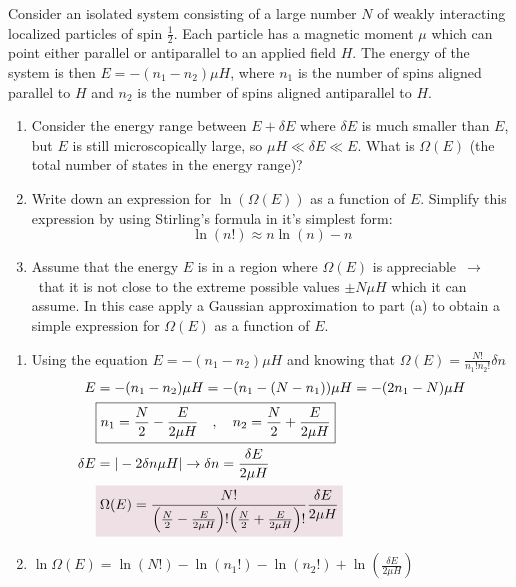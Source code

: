\documentclass{article}
\begin{document}
    \begin{problem}[Reif 2.4]
        Consider an isolated system consisting of a large number $N$ of weakly interacting localized particles of spin $\frac{1}{2}$. Each particle has a magnetic moment $\mu$ which can point either parallel or antiparallel to an applied field $H$. The energy of the system is then $E=-(n_1-n_2)\mu H$, where $n_1$ is the number of spins aligned parallel to $H$ and $n_2$ is the number of spins aligned antiparallel to $H$. 
        \begin{enumerate}[label=(\alph*)]
            \item Consider the energy range between $E+\delta E$ where $\delta E$ is much smaller than $E$, but $E$ is still microscopically large, so $\mu H \ll \delta E\ll E$. What is $\Omega(E)$ (the total number of states  in the energy range)?
            \item Write down an expression for $\ln(\Omega(E))$ as a function of $E$. Simplify this expression by using Stirling's formula in it's simplest form: $$\ln(n!)\approx n\ln(n)-n$$
            \item Assume that the energy $E$ is in a region where $\Omega(E)$ is appreciable~$\rightarrow$~that it is not close to the extreme possible values $\pm N\mu H$ which it can assume. In this case apply a Gaussian approximation to part (a) to obtain a simple expression for $\Omega(E)$ as a function of $E$.
        \end{enumerate}
        \answerline
        \begin{enumerate}[label=\alph*)]
            \item Using the equation $E=-(n_1-n_2)\mu H$ and knowing that $\Omega(E)=\frac{N!}{n_1!n_2!}\delta n$
            \begin{align*}
                E&=-(n_1-n_2)\mu H=-(n_1-(N-n_1))\mu H=-(2n_1-N)\mu H
                \\
                &\boxed{n_1=\frac{N}{2}-\frac{E}{2\mu H}\quad,\quad n_2=\frac{N}{2}+\frac{E}{2\mu H}}
                \\
                \delta E&=|-2\delta n\mu H|\rightarrow \delta n=\frac{\delta E}{2\mu H}
                \\
                &\coloredanswer{\Omega(E)=\frac{N!}{\qty(\oo[N]{2}-\frac{E}{2\mu H})!\qty(\oo[N]{2}+\frac{E}{2\mu H})!}\frac{\delta E}{2\mu H}}
            \end{align*}
            \item $\displaystyle\ln\Omega(E)=\ln(N!)-\ln(n_1!)-\ln(n_2!)+\ln(\frac{\delta E}{2\mu H})$

\end{enumerate}
\end{problem}
\end{document}
